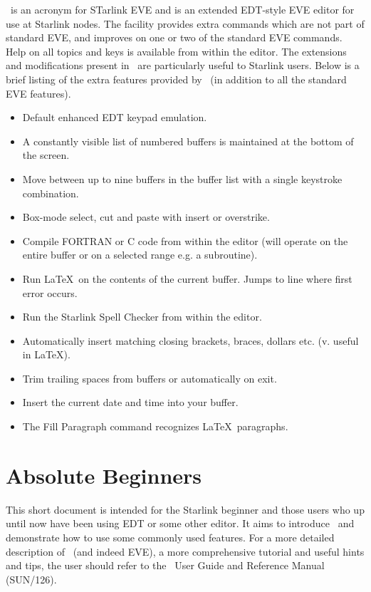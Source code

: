 \STEve\ is an acronym for STarlink EVE and is an extended EDT-style EVE
editor for use at Starlink nodes. The facility provides extra commands which
are not part of standard EVE, and improves on one or two of the standard EVE
commands. Help on all topics and keys is available from within the editor. The
extensions and modifications present in \STEve\ are particularly useful to
Starlink users. Below is a brief listing of the extra features provided by
\STEve\ (in addition to all the standard EVE features).

\begin{itemize}

\item Default enhanced EDT keypad emulation.
\item A constantly visible list of numbered buffers is maintained at the
       bottom of the screen.
\item Move between up to nine buffers in the buffer list with a single
      keystroke combination.
\item Box-mode select, cut and paste with insert or overstrike.
\item Compile FORTRAN or C code from within the editor (will operate on
      the entire buffer or on a selected range e.g. a subroutine).
\item Run \LaTeX\ on the contents of the current buffer. Jumps to
      line where first error occurs.
\item Run the Starlink Spell Checker from within the editor.
\item Automatically insert matching closing brackets, braces, dollars etc.
      (v. useful in \LaTeX).
\item Trim trailing spaces from buffers or automatically on exit.
\item Insert the current date and time into your buffer.
\item The Fill Paragraph command recognizes \LaTeX\ paragraphs.
\end{itemize}

\section*{Absolute Beginners}

This short document is intended for the Starlink beginner and those users who
up until now have been using EDT or some other editor. It aims to introduce
\STEve\ and demonstrate how to use some commonly used features. For a more
detailed description of \STEve\ (and indeed EVE), a more comprehensive tutorial
and useful hints and tips, the user should refer to the \STEve\ User Guide and
Reference Manual (SUN/126).

